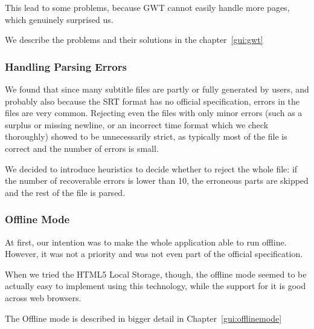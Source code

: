 This lead to some problems, because GWT cannot easily handle more pages, which genuinely surprised us.

We describe the problems and their solutions in the chapter~\ref{gui:gwt}


\subsubsection{Handling Parsing Errors}


We found that since many subtitle files are partly or fully generated by users, and probably also because the SRT format has no official specification, errors in the files are very common. Rejecting even the files with only minor errors (such as a surplus or missing newline, or an incorrect time format which we check thoroughly) showed to be unnecessarily strict, as typically most of the file is correct and the number of errors is small.

We decided to introduce heuristics to decide whether to reject the whole file: if the number of recoverable errors is lower than 10, the erroneous parts are skipped and the rest of the file is parsed.



\subsubsection{Offline Mode}
\label{ip:subsubsec:offline}

At first, our intention was to make the whole application able to run offline. However, it was not a priority and was not even part of the official specification.

When we tried the HTML5 Local Storage, though, the offline mode seemed to be actually easy to implement using this technology, while the support for it is good across web browsers.

The Offline mode is described in bigger detail in Chapter~\ref{gui:offlinemode}


